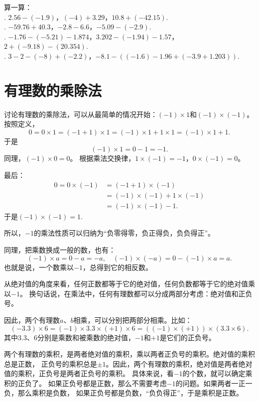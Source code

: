 \documentclass[12pt,UTF8,fontset=none]{ctexbook}
\begin{document}
\begin{xt}\label{xt:3-0-0}
    算一算：\\
    . $2.56 - (-1.9)$，$(-4) + 3.29$，$10.8 + (-42.15).$ \\
    . $-59.76 + 40.3$，$-2.8 - 6.6$，$-5.09 - (-2.9).$ \\
    . $-1.76 -(-5.21) - 1.874$，$3.202 - (-1.94) - 1.57$，$2 + (-9.18) - (20.354).$ \\
    . $3 - 2 - (-8) + (-2.2)$，$-8.1 - ((-1.6) - 1.96 + (-3.9 + 1.203)).$
\end{xt}

\section{有理数的乘除法}
讨论有理数的乘除法，可以从最简单的情况开始：$(-1) \times 1$和$(-1) \times (-1)$。按照定义，
$$0 = 0 \times 1 = (-1 + 1) \times 1 = (- 1) \times 1 + 1 \times 1 = (-1) \times 1 + 1.$$
于是
$$ (-1) \times 1 = 0 - 1 = -1.$$
同理，$(-1) \times 0 = 0$。
根据乘法交换律，$1 \times (-1) = -1$，$0 \times (-1) = 0$。

最后：
\begin{align*}
    0 = 0 \times (-1) &= (- 1 + 1) \times (-1)  \\
    &= (-1) \times (-1) + 1 \times (-1)  \\
    &= (-1) \times (-1) - 1. 
\end{align*}
于是$(-1) \times (-1) = 1.$

所以，$-1$的乘法性质可以归纳为“负零得零，负正得负，负负得正”。

同理，把乘数换成一般的数，也有：
$$(-1) \times a =  0 - a = -a, \quad (-1) \times (-a) = 0 - (-1) \times a = a.$$
也就是说，一个数乘以$-1$，总得到它的相反数。

从绝对值的角度来看，任何正数都等于它的绝对值，任何负数都等于它的绝对值乘以$-1$。
换句话说，在乘法中，任何有理数都可以分成两部分考虑：绝对值和正负号。

因此，两个有理数$a$、$b$相乘，可以分别把两部分相乘。比如：
$$ (-3.3) \times 6 = (-1) \times 3.3 \times (+1) \times 6 = ((-1) \times (+1)) \times (3.3 \times 6).$$
其中$3.3$、$6$分别是乘数和被乘数的绝对值，$-1$和$+1$是它们的正负号。

两个有理数的乘积，是两者绝对值的乘积，乘以两者正负号的乘积。绝对值的乘积总是正数，
正负号的乘积总是$\pm 1$。因此，两个有理数的乘积，绝对值是两者绝对值的乘积，正负号是两者正负号的乘积。
具体来说，看$-1$的个数，就可以确定乘积的正负了。
如果正负号都是正数，那么不需要考虑$-1$的问题。如果两者一正一负，那么乘积是负数，
如果正负号都是负数，“负负得正”，于是乘积是正数。
\end{document}
